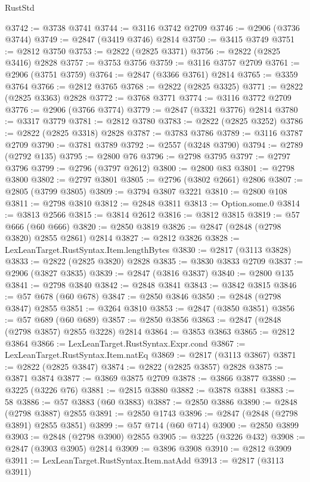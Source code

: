 \begin{lexlean}{RustStd}
\begin{coremodule}
@3742 := @3738 @3741
@3744 := @3116 @3742 @2709
@3746 := @2906 (@3736 @3744)
@3749 := @2847 (@3419 @3746) @2814
@3750 := @3415 @3749
@3751 := @2812 @3750
@3753 := @2822 (@2825 @3371)
@3756 := @2822 (@2825 @3416) @2828
@3757 := @3753 @3756
@3759 := @3116 @3757 @2709
@3761 := @2906 (@3751 @3759)
@3764 := @2847 (@3366 @3761) @2814
@3765 := @3359 @3764
@3766 := @2812 @3765
@3768 := @2822 (@2825 @3325)
@3771 := @2822 (@2825 @3363) @2828
@3772 := @3768 @3771
@3774 := @3116 @3772 @2709
@3776 := @2906 (@3766 @3774)
@3779 := @2847 (@3321 @3776) @2814
@3780 := @3317 @3779
@3781 := @2812 @3780
@3783 := @2822 (@2825 @3252)
@3786 := @2822 (@2825 @3318) @2828
@3787 := @3783 @3786
@3789 := @3116 @3787 @2709
@3790 := @3781 @3789
@3792 := @2557 (@3248 @3790)
@3794 := @2789 (@2792 @135)
@3795 := @2800 @76
@3796 := @2798 @3795
@3797 := @2797 @3796
@3799 := @2796 (@3797 @2612)
@3800 := @2800 @83
@3801 := @2798 @3800
@3802 := @2797 @3801
@3805 := @2796 (@3802 @2661) @2806
@3807 := @2805 (@3799 @3805)
@3809 := @3794 @3807 @3221
@3810 := @2800 @108
@3811 := @2798 @3810
@3812 := @2848 @3811
@3813 := Option.some.{0}
@3814 := @3813 @2566
@3815 := @3814 @2612
@3816 := @3812 @3815
@3819 := @57 @666 (@60 @666)
@3820 := @2850 @3819
@3826 := @2847 (@2848 (@2798 @3820) @2855 @2861) @2814
@3827 := @2812 @3826
@3828 := LexLeanTarget.RustSyntax.Item.lengthBytes
@3830 := @2817 (@3113 @3828)
@3833 := @2822 (@2825 @3820) @2828
@3835 := @3830 @3833 @2709
@3837 := @2906 (@3827 @3835)
@3839 := @2847 (@3816 @3837)
@3840 := @2800 @135
@3841 := @2798 @3840
@3842 := @2848 @3841
@3843 := @3842 @3815
@3846 := @57 @678 (@60 @678)
@3847 := @2850 @3846
@3850 := @2848 (@2798 @3847) @2855
@3851 := @3264 @3810
@3853 := @2847 (@3850 @3851)
@3856 := @57 @689 (@60 @689)
@3857 := @2850 @3856
@3863 := @2847 (@2848 (@2798 @3857) @2855 @3228) @2814
@3864 := @3853 @3863
@3865 := @2812 @3864
@3866 := LexLeanTarget.RustSyntax.Expr.cond
@3867 := LexLeanTarget.RustSyntax.Item.natEq
@3869 := @2817 (@3113 @3867)
@3871 := @2822 (@2825 @3847)
@3874 := @2822 (@2825 @3857) @2828
@3875 := @3871 @3874
@3877 := @3869 @3875 @2709
@3878 := @3866 @3877
@3880 := @3225 (@3226 @76)
@3881 := @2815 @3880
@3882 := @3878 @3881
@3883 := 58
@3886 := @57 @3883 (@60 @3883)
@3887 := @2850 @3886
@3890 := @2848 (@2798 @3887) @2855
@3891 := @2850 @1743
@3896 := @2847 (@2848 (@2798 @3891) @2855 @3851)
@3899 := @57 @714 (@60 @714)
@3900 := @2850 @3899
@3903 := @2848 (@2798 @3900) @2855
@3905 := @3225 (@3226 @432)
@3908 := @2847 (@3903 @3905) @2814
@3909 := @3896 @3908
@3910 := @2812 @3909
@3911 := LexLeanTarget.RustSyntax.Item.natAdd
@3913 := @2817 (@3113 @3911)

\end{coremodule}
\end{lexlean}
